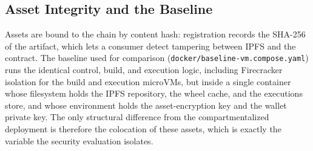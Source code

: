 \subsection{Asset Integrity and the Baseline}

Assets are bound to the chain by content hash: registration records the SHA-256
of the artifact, which lets a consumer detect tampering between IPFS and the
contract. The baseline used for comparison
(\texttt{docker/baseline-vm.compose.yaml}) runs the identical control, build, and
execution logic, including Firecracker isolation for the build and execution
microVMs, but inside a single container whose filesystem holds the IPFS
repository, the wheel cache, and the executions store, and whose environment
holds the asset-encryption key and the wallet private key. The only structural
difference from the compartmentalized deployment is therefore the colocation of
these assets, which is exactly the variable the security evaluation isolates.
